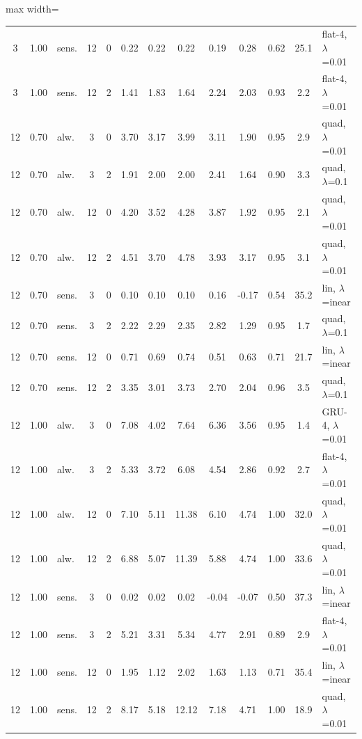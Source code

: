 \begin{table}[htbp]
\begin{adjustbox}{max width=\textwidth}
\begin{tabular}{cclcc cccc c cc l}
3 & 1.00 & sens. & 12 & 0 & 0.22 & 0.22 & 0.22 & 0.19 & 0.28 & 0.62 & 25.1 & flat-4, $\lambda$=0.01 \\
3 & 1.00 & sens. & 12 & 2 & 1.41 & 1.83 & 1.64 & 2.24 & 2.03 & 0.93 & 2.2 & flat-4, $\lambda$=0.01 \\
12 & 0.70 & alw. & 3 & 0 & 3.70 & 3.17 & 3.99 & 3.11 & 1.90 & 0.95 & 2.9 & quad, $\lambda$=0.01 \\
12 & 0.70 & alw. & 3 & 2 & 1.91 & 2.00 & 2.00 & 2.41 & 1.64 & 0.90 & 3.3 & quad, $\lambda$=0.1 \\
12 & 0.70 & alw. & 12 & 0 & 4.20 & 3.52 & 4.28 & 3.87 & 1.92 & 0.95 & 2.1 & quad, $\lambda$=0.01 \\
12 & 0.70 & alw. & 12 & 2 & 4.51 & 3.70 & 4.78 & 3.93 & 3.17 & 0.95 & 3.1 & quad, $\lambda$=0.01 \\
12 & 0.70 & sens. & 3 & 0 & 0.10 & 0.10 & 0.10 & 0.16 & -0.17 & 0.54 & 35.2 & lin, $\lambda$=inear \\
12 & 0.70 & sens. & 3 & 2 & 2.22 & 2.29 & 2.35 & 2.82 & 1.29 & 0.95 & 1.7 & quad, $\lambda$=0.1 \\
12 & 0.70 & sens. & 12 & 0 & 0.71 & 0.69 & 0.74 & 0.51 & 0.63 & 0.71 & 21.7 & lin, $\lambda$=inear \\
12 & 0.70 & sens. & 12 & 2 & 3.35 & 3.01 & 3.73 & 2.70 & 2.04 & 0.96 & 3.5 & quad, $\lambda$=0.1 \\
12 & 1.00 & alw. & 3 & 0 & 7.08 & 4.02 & 7.64 & 6.36 & 3.56 & 0.95 & 1.4 & GRU-4, $\lambda$=0.01 \\
12 & 1.00 & alw. & 3 & 2 & 5.33 & 3.72 & 6.08 & 4.54 & 2.86 & 0.92 & 2.7 & flat-4, $\lambda$=0.01 \\
12 & 1.00 & alw. & 12 & 0 & 7.10 & 5.11 & 11.38 & 6.10 & 4.74 & 1.00 & 32.0 & quad, $\lambda$=0.01 \\
12 & 1.00 & alw. & 12 & 2 & 6.88 & 5.07 & 11.39 & 5.88 & 4.74 & 1.00 & 33.6 & quad, $\lambda$=0.01 \\
12 & 1.00 & sens. & 3 & 0 & 0.02 & 0.02 & 0.02 & -0.04 & -0.07 & 0.50 & 37.3 & lin, $\lambda$=inear \\
12 & 1.00 & sens. & 3 & 2 & 5.21 & 3.31 & 5.34 & 4.77 & 2.91 & 0.89 & 2.9 & flat-4, $\lambda$=0.01 \\
12 & 1.00 & sens. & 12 & 0 & 1.95 & 1.12 & 2.02 & 1.63 & 1.13 & 0.71 & 35.4 & lin, $\lambda$=inear \\
12 & 1.00 & sens. & 12 & 2 & 8.17 & 5.18 & 12.12 & 7.18 & 4.71 & 1.00 & 18.9 & quad, $\lambda$=0.01 \\
\bottomrule
\end{tabular}
\end{adjustbox}
\end{table}